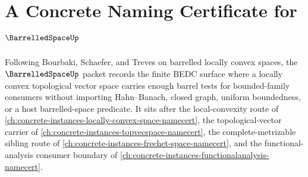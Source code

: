 \chapter{A Concrete Naming Certificate for $\BarrelledSpaceUp$}
\label{ch:concrete-instances-barrelled-space-namecert}

Following Bourbaki, Schaefer, and Treves on barrelled locally convex spaces, the $\BarrelledSpaceUp$ packet records the finite BEDC surface where a locally convex topological vector space carries enough barrel tests for bounded-family consumers without importing Hahn--Banach, closed graph, uniform boundedness, or a host barrelled-space predicate. It sits after the local-convexity route of \autoref{ch:concrete-instances-locally-convex-space-namecert}, the topological-vector carrier of \autoref{ch:concrete-instances-topvecspace-namecert}, the complete-metrizable sibling route of \autoref{ch:concrete-instances-frechet-space-namecert}, and the functional-analysis consumer boundary of \autoref{ch:concrete-instances-functionalanalysis-namecert}.

